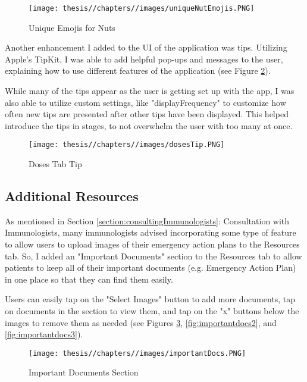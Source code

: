 \begin{figure} [H]
    \centering
    \texttt{[image: thesis//chapters//images/uniqueNutEmojis.PNG]}
    \caption{Unique Emojis for Nuts}
    \label{fig:nut-emojis}
\end{figure}

Another enhancement I added to the UI of the application was tips. Utilizing Apple's TipKit, I was able to add helpful pop-ups and messages to the user, explaining how to use different features of the application (see Figure \ref{fig:tips}).

While many of the tips appear as the user is getting set up with the app, I was also able to utilize custom settings, like "displayFrequency" to customize how often new tips are presented after other tips have been displayed. This helped introduce the tips in stages, to not overwhelm the user with too many at once.

\begin{figure} [H]
    \centering
    \texttt{[image: thesis//chapters//images/dosesTip.PNG]}
    \caption{Doses Tab Tip}
     \label{fig:tips}
\end{figure}

\subsection{Additional Resources}

As mentioned in Section \ref{section:consultingImmunologists}: Consultation with Immunologists, many immunologists advised incorporating some type of feature to allow users to upload images of their emergency action plans to the Resources tab. So, I added an "Important Documents" section to the Resources tab to allow patients to keep all of their important documents (e.g. Emergency Action Plan) in one place so that they can find them easily.

Users can easily tap on the "Select Images" button to add more documents, tap on documents in the section to view them, and tap on the "x" buttons below the images to remove them as needed (see Figures \ref{fig:importantdocs}, \ref{fig:importantdocs2}, and \ref{fig:importantdocs3}).

\begin{figure} [H]
    \centering
    \texttt{[image: thesis//chapters//images/importantDocs.PNG]}
    \caption{Important Documents Section}
     \label{fig:importantdocs}
\end{figure}

